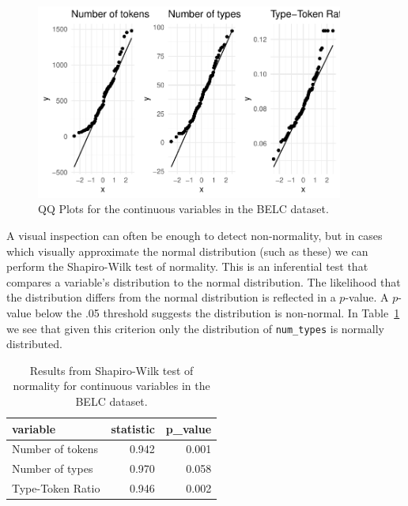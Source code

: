 \documentclass[
  letterpaper,
]{latex/krantz}
\begin{document}
\begin{figure}[h]

{\centering \includegraphics[width=0.9\textwidth,height=\textheight]{./approaching-analysis_files/figure-pdf/fig-summaries-qqnorm-plot-belc-1.pdf}

}

\caption{\label{fig-summaries-qqnorm-plot-belc}QQ Plots for the
continuous variables in the BELC dataset.}

\end{figure}

A visual inspection can often be enough to detect non-normality, but in
cases which visually approximate the normal distribution (such as these)
we can perform the Shapiro-Wilk test of normality. This is an
inferential test that compares a variable's distribution to the normal
distribution. The likelihood that the distribution differs from the
normal distribution is reflected in a \(p\)-value. A \(p\)-value below
the .05 threshold suggests the distribution is non-normal. In
Table~\ref{tbl-summaries-normality-test-belc} we see that given this
criterion only the distribution of \texttt{num\_types} is normally
distributed.

\hypertarget{tbl-summaries-normality-test-belc}{}
\begin{table}
\caption{\label{tbl-summaries-normality-test-belc}Results from Shapiro-Wilk test of normality for continuous variables in
the BELC dataset. }\tabularnewline

\centering
\begin{tabular}{lrr}
\toprule
variable & statistic & p\_value\\
\midrule
Number of tokens & 0.942 & 0.001\\
Number of types & 0.970 & 0.058\\
Type-Token Ratio & 0.946 & 0.002\\
\bottomrule
\end{tabular}
\end{table}
\end{document}
